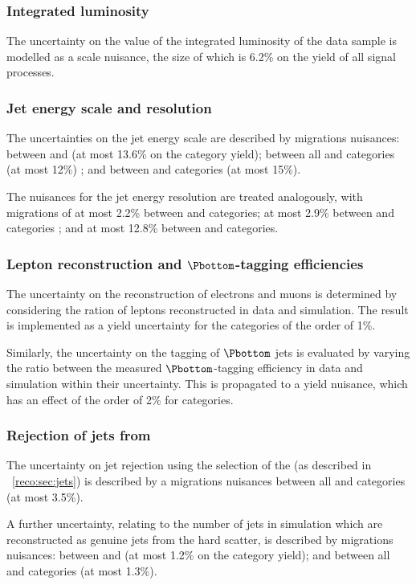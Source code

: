 \subsubsection{Integrated luminosity}
The uncertainty on the value of the integrated luminosity of the data sample is modelled as a scale nuisance, the size of which is 6.2\% on the yield of all signal processes. 

\subsubsection{Jet energy scale and resolution}
The uncertainties on the jet energy scale are described by migrations nuisances: between  and  (at most 13.6\% on the category yield); between all \VBF and \Untagged categories (at most 12\%) ; and between \TTHTag and \Untagged categories (at most 15\%).

The nuisances for the jet energy resolution are treated analogously, with migrations of at most 2.2\% between  and  categories; at most 2.9\% between \VBF and \Untagged categories ; and at most 12.8\% between \TTHTag and \Untagged categories.

\subsubsection{Lepton reconstruction and $\Pbottom$-tagging efficiencies}
The uncertainty on the reconstruction of electrons and muons is determined by considering the ration of leptons reconstructed in data and simulation. The result is implemented as a yield uncertainty for the \TTHTag categories of the order of 1\%.

Similarly, the uncertainty on the tagging of $\Pbottom$ jets is evaluated by varying the ratio between the measured $\Pbottom$-tagging efficiency in data and simulation within their uncertainty. This is propagated to a yield nuisance, which has an effect of the order of 2\% for \TTHTag categories.

\subsubsection{Rejection of jets from \PU}
The uncertainty on \PU jet rejection using the selection of the \RMS (as described in \Sec~\ref{reco:sec:jets}) is described by a migrations nuisances between all \VBF and \Untagged categories (at most 3.5\%).

A further uncertainty, relating to the number of \PU jets in simulation which are reconstructed as genuine jets from the hard scatter, is described by migrations nuisances: between  and  (at most 1.2\% on the category yield); and between all \VBF and \Untagged categories (at most 1.3\%).

